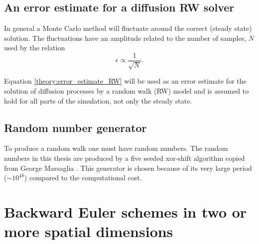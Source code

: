 \subsection{An error estimate for a diffusion RW solver}

In general a Monte Carlo method will fluctuate around the correct (steady state) solution. The fluctuations have an amplitude related to the number of samples, $N$ used by the relation
\begin{equation}\label{theory:error_estimate_RW}
 \epsilon \propto \frac{1}{\sqrt N}.
\end{equation}

\noindent Equation \eqref{theory:error_estimate_RW} will be used as an error estimate for the solution of diffusion processes by a random walk (RW) model and is assumed to hold for all parts of the simulation, not only the steady state.

\subsection{Random number generator}

To produce a random walk one must have random numbers. 
The random numbers in this thesis are produced by a five seeded xor-shift algorithm copied from George Marsaglia \cite{marsaglia2003xorshift}. 
This generator is chosen because of its very large period ($\sim10^{48}$) compared to the computational cost.

\section{Backward Euler schemes in two or more spatial dimensions}\label{theory:section:BE2D}

